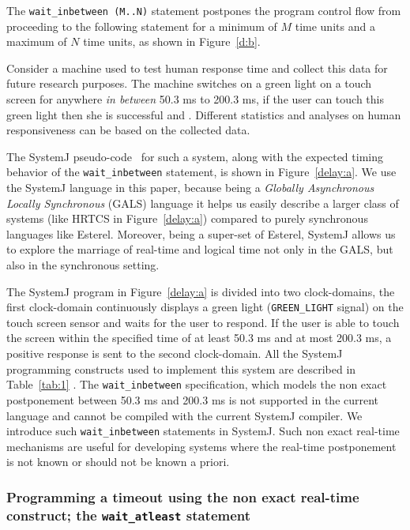The \texttt{wait\_inbetween (M..N)} statement postpones the program
control flow from proceeding to the following statement for a minimum of
$M$ time units and a maximum of $N$ time units, as shown in
Figure~\ref{d:b}.

Consider a machine used to test human response time and collect this
data for future research purposes. The machine switches on a green light
on a touch screen for anywhere \textit{in between} 50.3 ms to 200.3 ms,
if the user can touch this green light then she is successful and . Different statistics and analyses on human
responsiveness can be based on the collected data.

The SystemJ pseudo-code~\cite{amal10} for such a system, along with the
expected timing behavior of the \texttt{wait\-\_inbetween} statement, is
shown in Figure~\ref{delay:a}. We use the SystemJ language in this paper,
because being a \textit{Globally Asynchronous Locally Synchronous}
(GALS) language it helps us easily describe a larger class of systems
(like HRTCS in Figure~\ref{delay:a}) compared to purely synchronous
languages like Esterel. Moreover, being a super-set of Esterel, SystemJ
allows us to explore the marriage of real-time and logical time not only
in the GALS, but also in the synchronous setting.

The SystemJ program in Figure~\ref{delay:a} is divided into two
 clock-domains, the first clock-domain
continuously displays a green light (\texttt{GREEN\_LIGHT} signal) on
the touch screen sensor and waits for the user to respond. If the user
is able to touch the screen within the specified time of at least 50.3
ms and at most 200.3 ms, a positive response is sent to the second
clock-domain. All the SystemJ programming constructs used to implement
this system are described in Table~\ref{tab:1} . The \texttt{wait\_inbetween}
specification, which models the non exact postponement between 50.3 ms
and 200.3 ms is not supported in the current language and cannot be
compiled with the current SystemJ compiler. We introduce such
\texttt{wait\_inbetween} statements in SystemJ. Such non exact real-time
mechanisms are useful for developing systems where the real-time
postponement is not known or should not be known a priori.

\subsubsection{Programming a timeout using the non exact real-time
  construct; the \texttt{wait\_atleast} statement}
\label{sec:progr-time-using}

